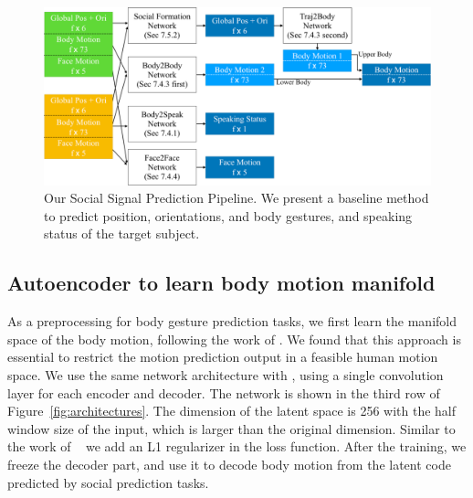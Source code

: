 \begin{figure}[t]	
	\includegraphics[width=\textwidth]{ssp_fig/ssp_pipeline_wFace}
	\caption{Our Social Signal Prediction Pipeline. We present a baseline method to predict position, orientations, and body gestures, and speaking status of the target subject. }
	\label{fig:pipeline}
\end{figure}

\subsection{Autoencoder to learn body motion manifold}
\label{sec:autoencoder}
As a preprocessing for body gesture prediction tasks, we first learn the manifold space of the body motion, following the work of \cite{holden2016deep}. We found that this approach is essential to restrict the motion prediction output in a feasible human motion space. We use the same network architecture with \cite{holden2016deep}, using a single convolution layer for each encoder and decoder. The network is shown in the third row of  Figure~\ref{fig:architectures}. The dimension of the latent space is 256 with the half window size of the input, which is larger than the original dimension. Similar to the work of ~\cite{holden2016deep} we add an L1 regularizer in the loss function. After the training, we freeze the decoder part, and use it to decode body motion from the latent code predicted by social prediction tasks.

